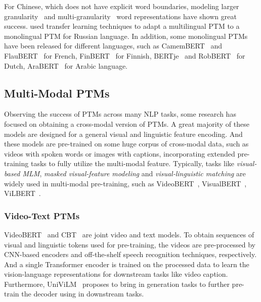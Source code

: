 \documentclass[fleqn]{SCYE-arxiv}
\begin{document}
\begin{multicols}{2}
For Chinese, which does not have explicit word boundaries, modeling larger granularity~\cite{cui2019pretraining,diao2019zen,wei2019nezha} and multi-granularity~\cite{sun2019ernie,sun2019ernie2} word representations have shown great success. \citet{kuratov2019adaptation} used transfer learning techniques to adapt a multilingual PTM to a monolingual PTM for Russian language. In addition, some monolingual PTMs have been released for different languages, such as CamemBERT~\cite{martin2019camenbert} and FlauBERT~\cite{le2019flaubert} for French, FinBERT~\cite{virtanen2019multilingual} for Finnish, BERTje~\cite{vries2019bertje} and  RobBERT~\cite{delobelle2020robbert} for Dutch,
AraBERT~\cite{antoun2020arabert} for Arabic language.

\subsection{Multi-Modal PTMs}
\label{sec:ptms-mutimodel}


Observing the success of PTMs across many NLP tasks, some research has focused on obtaining a cross-modal version of PTMs. A great majority of these models are designed for a general visual and linguistic feature encoding. And these models are pre-trained on some huge corpus of cross-modal data, such as videos with spoken words or images with captions, incorporating extended pre-training tasks to fully utilize the multi-modal feature.
Typically, tasks like \textit{visual-based MLM}, \textit{masked visual-feature modeling} and \textit{visual-linguistic matching} are widely used in multi-modal pre-training, such as VideoBERT~\cite{sun2019videobert}, VisualBERT~\cite{DBLP:journals/corr/abs-1908-03557}, ViLBERT~\cite{lu2019vilbert}.

\subsubsection{Video-Text PTMs}

VideoBERT~\cite{sun2019videobert} and CBT~\cite{DBLP:journals/corr/abs-1906-05743} are joint video and text models. To obtain sequences of visual and linguistic tokens used for pre-training, the videos are pre-processed by CNN-based encoders and off-the-shelf speech recognition techniques, respectively. And a single Transformer encoder is trained on the processed data to learn the vision-language representations for downstream tasks like video caption. Furthermore, UniViLM~\cite{luo2020univilm} proposes to bring in generation tasks to further pre-train the decoder using in downstream tasks.


\end{multicols}
\end{document}

